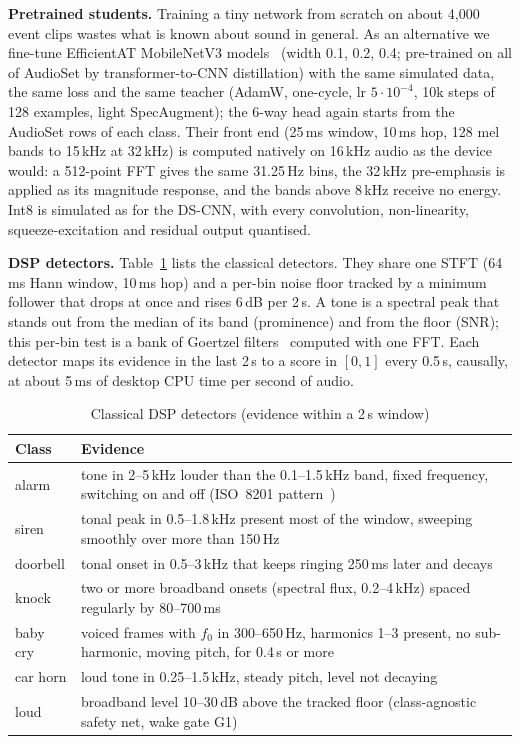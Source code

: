 \documentclass[conference]{IEEEtran}
\begin{document}
\textbf{Pretrained students.} Training a tiny network from scratch on about 4{,}000 event clips
wastes what is known about sound in general. As an alternative we fine-tune EfficientAT
MobileNetV3 models~\cite{efficientat} (width 0.1, 0.2, 0.4; pre-trained on all of AudioSet by
transformer-to-CNN distillation) with the same simulated data, the same loss and the same
teacher (AdamW, one-cycle, lr $5\cdot10^{-4}$, 10k steps of 128 examples, light SpecAugment);
the 6-way head again starts from the AudioSet rows of each class. Their front end (25\,ms window,
10\,ms hop, 128 mel bands to 15\,kHz at 32\,kHz) is computed natively on 16\,kHz audio as the
device would: a 512-point FFT gives the same 31.25\,Hz bins, the 32\,kHz pre-emphasis is applied
as its magnitude response, and the bands above 8\,kHz receive no energy. Int8 is simulated as for
the DS-CNN, with every convolution, non-linearity, squeeze-excitation and residual output
quantised.

\textbf{DSP detectors.} Table~\ref{tab:dsp} lists the classical detectors. They share one STFT
(64\,ms Hann window, 10\,ms hop) and a per-bin noise floor tracked by a minimum follower that
drops at once and rises 6\,dB per 2\,s. A tone is a spectral peak that stands out from the
median of its band (prominence) and from the floor (SNR); this per-bin test is a bank of
Goertzel filters~\cite{goertzel} computed with one FFT. Each detector maps its evidence in the
last 2\,s to a score in $[0,1]$ every 0.5\,s, causally, at about 5\,ms of desktop CPU time per
second of audio.

\begin{table}[t]\centering\caption{Classical DSP detectors (evidence within a 2\,s window)}\label{tab:dsp}
\setlength{\tabcolsep}{3pt}
\begin{tabular}{lp{}}\toprule
Class & Evidence \\ \midrule
alarm & tone in 2--5\,kHz louder than the 0.1--1.5\,kHz band, fixed frequency, switching on and off (ISO~8201 pattern~\cite{iso8201}) \\
siren & tonal peak in 0.5--1.8\,kHz present most of the window, sweeping smoothly over more than 150\,Hz \\
doorbell & tonal onset in 0.5--3\,kHz that keeps ringing 250\,ms later and decays \\
knock & two or more broadband onsets (spectral flux, 0.2--4\,kHz) spaced regularly by 80--700\,ms \\
baby cry & voiced frames with $f_0$ in 300--650\,Hz, harmonics 1--3 present, no sub-harmonic, moving pitch, for 0.4\,s or more \\
car horn & loud tone in 0.25--1.5\,kHz, steady pitch, level not decaying \\
loud & broadband level 10--30\,dB above the tracked floor (class-agnostic safety net, wake gate G1) \\ \bottomrule
\end{tabular}\end{table}
\end{document}
